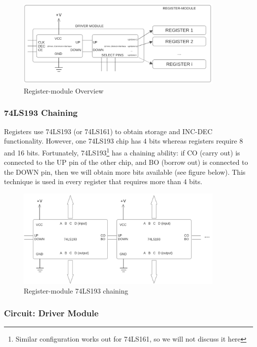 \begin{figure}[H]
	\centering
	\includegraphics[width=0.9\textwidth]{img/register_module_overview}
	\caption{Register-module Overview}
	\label{fig:registerModuleOverview}
\end{figure}

\subsubsection{74LS193 Chaining}
Registers use 74LS193 (or 74LS161) to obtain storage and INC-DEC functionality. However, one 74LS193 chip has 4 bits whereas registers require 8 and 16 bits. Fortunately, 74LS193\footnote{Similar configuration works out for 74LS161, so we will not discuss it here} has a chaining ability: if CO (carry out) is connected to the UP pin of the other chip, and BO (borrow out) is connected to the DOWN pin, then we will obtain more bits available (see figure below). This technique is used in every register that requires more than 4 bits.

\begin{figure}[H]
	\centering
	\includegraphics[width=0.9\textwidth]{img/register_module_chaining}
	\caption{Register-module 74LS193 chaining}
	\label{fig:registerModuleChaining}
\end{figure}

\subsubsection{Circuit: Driver Module}

